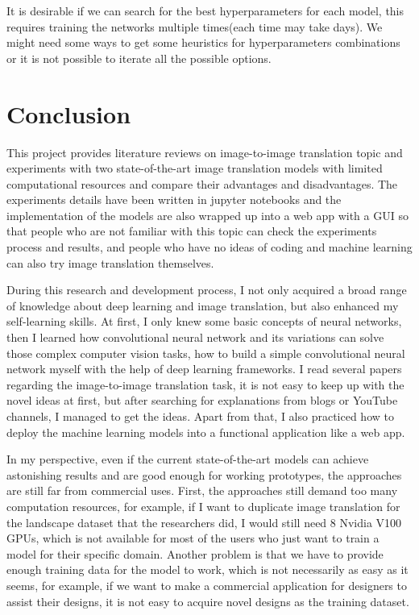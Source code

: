 \begin{itemize}
    It is desirable if we can search for the best hyperparameters for each model, this requires 
    training the networks multiple times(each time may take days). We might need some ways to 
    get some heuristics for hyperparameters combinations or it is not possible to iterate all 
    the possible options.
\end{itemize}

\section{Conclusion}
This project provides literature reviews on image-to-image translation topic
and experiments with two state-of-the-art image translation 
models with limited computational resources and compare their advantages and 
disadvantages. The experiments details have been written in jupyter notebooks 
and the implementation of the models are also wrapped up into a web app 
with a GUI so that people who are not familiar 
with this topic can check the experiments process and results, and people
who have no ideas of coding and machine learning can also try image translation themselves.  

During this research and development process, I not only acquired a broad range of knowledge 
about deep learning and image translation, but also enhanced my self-learning skills. 
At first, I only knew some basic concepts of neural networks, then I learned how convolutional 
neural network and its variations can solve those complex computer vision tasks, how to build a 
simple convolutional neural network myself with the help of deep learning frameworks. I read 
several papers regarding the image-to-image translation task, it is not easy to keep up with the 
novel ideas at first, but after searching for explanations from blogs or YouTube channels, I 
managed to get the ideas. Apart from that, I also practiced how to deploy the machine learning 
models into a functional application like a web app.

In my perspective, even if the current state-of-the-art models can achieve 
astonishing results and are good enough for working prototypes, 
the approaches are still far from commercial uses.
First, the approaches still demand too many computation resources,
for example, if I want to duplicate image translation for the landscape dataset 
that the researchers did, I would still need 8 Nvidia V100 GPUs, which is not 
available for most of the users who just want to train a model for their specific domain. 
Another problem is that we have to provide enough training data for the model to work,
which is not necessarily as easy as it seems, for example, 
if we want to make a commercial application for designers to assist their designs, 
it is not easy to acquire novel designs as the training dataset.